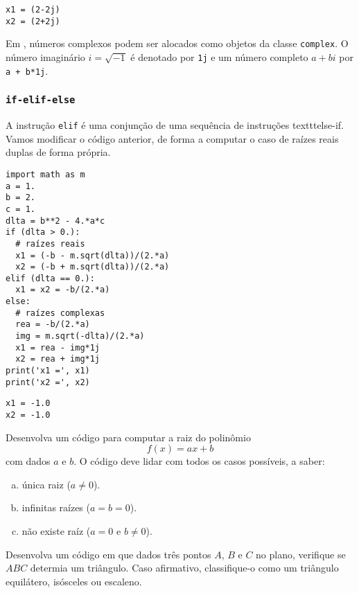 \documentclass[a4paper,10pt,twoside]{article}
\begin{document}
\begin{verbatim}
x1 = (2-2j)
x2 = (2+2j)
\end{verbatim}

\begin{obs}
  Em {\python}, números complexos podem ser alocados como objetos da classe \texttt{complex}. O número imaginário $i = \sqrt{-1}$ é denotado por \texttt{1j} e um número completo $a + bi$ por \texttt{a + b*1j}.
\end{obs}

\subsubsection{\texttt{if-elif-else}}

A instrução \texttt{elif} é uma conjunção de uma sequência de instruções texttt{else-if}. Vamos modificar o código anterior, de forma a computar o caso de raízes reais duplas de forma própria.

\begin{lstlisting}
import math as m
a = 1.
b = 2.
c = 1.
dlta = b**2 - 4.*a*c
if (dlta > 0.):
  # raízes reais
  x1 = (-b - m.sqrt(dlta))/(2.*a)
  x2 = (-b + m.sqrt(dlta))/(2.*a)
elif (dlta == 0.):
  x1 = x2 = -b/(2.*a)
else:
  # raízes complexas
  rea = -b/(2.*a)
  img = m.sqrt(-dlta)/(2.*a)
  x1 = rea - img*1j
  x2 = rea + img*1j
print('x1 =', x1)
print('x2 =', x2)
\end{lstlisting}

\begin{verbatim}
x1 = -1.0
x2 = -1.0
\end{verbatim}

\begin{exr}
  Desenvolva um código para computar a raiz do polinômio
  \begin{equation}
    f(x) = ax + b
  \end{equation}
  com dados $a$ e $b$. O código deve lidar com todos os casos possíveis, a saber:
  \begin{enumerate}[a)]
    \item única raiz ($a\neq 0$).
    \item infinitas raízes ($a=b=0$).
    \item não existe raíz ($a = 0$ e $b \neq 0$).
  \end{enumerate}
\end{exr}

\begin{exr}
  Desenvolva um código em que dados três pontos $A$, $B$ e $C$ no plano, verifique se $ABC$ determia um triângulo. Caso afirmativo, classifique-o como um triângulo equilátero, isósceles ou escaleno.
\end{exr}
\end{document}
